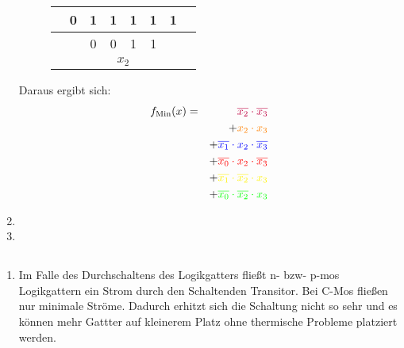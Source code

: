 \documentclass[DIN, pagenumber=false, fontsize=11pt, parskip=half]{scrartcl}
\begin{document}
\begin{enumerate}[label = (\alph*)]
\begin{figure}[H]
\begin{tabular}{cc|cccc|cc}
                     & 0 & \cellcolor{cyan}1 & \cellcolor{yellow!50}1 & \cellcolor{orange!50}1 & \cellcolor{orange!50}1 & 1\\
                    \midrule
                    & & 0 & 0 & 1 & 1\\
                    & &  & \multicolumn{2}{c}{$x_2$} & & \\
                \end{tabular}
            \end{figure}
            Daraus ergibt sich:
            \begin{eqnarray*}
                f_\text{Min}(x) &=& \textcolor{purple}{\overline{x_2} \cdot \overline{x_3}} \\ 
                    && + \textcolor{orange}{x_2 \cdot x_3} \\ 
                    && + \textcolor{blue}{\overline{x_1} \cdot x_2 \cdot \overline{x_3}} \\ 
                    && + \textcolor{red}{\overline{x_0} \cdot x_2 \cdot \overline{x_3}} \\ 
                    && + \textcolor{yellow}{\overline{x_1} \cdot \overline{x_2} \cdot x_3} \\ 
                    && + \textcolor{green}{\overline{x_0} \cdot \overline{x_2} \cdot x_3} \\ 
            \end{eqnarray*}
        \item %
        \item %
    \end{enumerate}

    \subsection{}
    \begin{enumerate}[label = (\alph*)]
        \item Im Falle des \glqq{}Durchschaltens\grqq{} des Logikgatters fließt n- bzw- p-mos Logikgattern ein Strom durch den Schaltenden Transitor. Bei C-Mos fließen nur minimale Ströme.
            Dadurch erhitzt sich die Schaltung nicht so sehr und es können mehr Gattter auf kleinerem Platz ohne thermische Probleme platziert werden.
    \end{enumerate}
\end{document}
